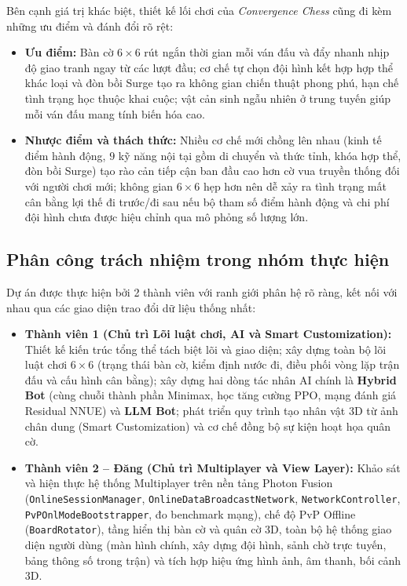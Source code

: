 Bên cạnh giá trị khác biệt, thiết kế lối chơi của \textit{Convergence Chess} cũng đi kèm những ưu điểm và đánh đổi rõ rệt:
\begin{itemize}
    \item \textbf{Ưu điểm:} Bàn cờ $6 \times 6$ rút ngắn thời gian mỗi ván đấu và đẩy nhanh nhịp độ giao tranh ngay từ các lượt đầu; cơ chế tự chọn đội hình kết hợp hợp thể khác loại và đòn bồi Surge tạo ra không gian chiến thuật phong phú, hạn chế tình trạng học thuộc khai cuộc; vật cản sinh ngẫu nhiên ở trung tuyến giúp mỗi ván đấu mang tính biến hóa cao.
    \item \textbf{Nhược điểm và thách thức:} Nhiều cơ chế mới chồng lên nhau (kinh tế điểm hành động, $9$ kỹ năng nội tại gồm di chuyển và thức tỉnh, khóa hợp thể, đòn bồi Surge) tạo rào cản tiếp cận ban đầu cao hơn cờ vua truyền thống đối với người chơi mới; không gian $6 \times 6$ hẹp hơn nên dễ xảy ra tình trạng mất cân bằng lợi thế đi trước/đi sau nếu bộ tham số điểm hành động và chi phí đội hình chưa được hiệu chỉnh qua mô phỏng số lượng lớn.
\end{itemize}

\subsection{Phân công trách nhiệm trong nhóm thực hiện}
Dự án được thực hiện bởi 2 thành viên với ranh giới phân hệ rõ ràng, kết nối với nhau qua các giao diện trao đổi dữ liệu thống nhất:
\begin{itemize}
    \item \textbf{Thành viên 1 (Chủ trì Lõi luật chơi, AI và Smart Customization):} Thiết kế kiến trúc tổng thể tách biệt lõi và giao diện; xây dựng toàn bộ lõi luật chơi $6 \times 6$ (trạng thái bàn cờ, kiểm định nước đi, điều phối vòng lặp trận đấu và cấu hình cân bằng); xây dựng hai dòng tác nhân AI chính là \textbf{Hybrid Bot} (cùng chuỗi thành phần Minimax, học tăng cường PPO, mạng đánh giá Residual NNUE) và \textbf{LLM Bot}; phát triển quy trình tạo nhân vật 3D từ ảnh chân dung (Smart Customization) và cơ chế đồng bộ sự kiện hoạt họa quân cờ.
    \item \textbf{Thành viên 2 -- Đăng (Chủ trì Multiplayer và View Layer):} Khảo sát và hiện thực hệ thống Multiplayer trên nền tảng Photon Fusion (\texttt{OnlineSessionManager}, \texttt{OnlineDataBroadcastNetwork}, \texttt{NetworkController}, \texttt{PvPOnlModeBootstrapper}, đo benchmark mạng), chế độ PvP Offline (\texttt{BoardRotator}), tầng hiển thị bàn cờ và quân cờ 3D, toàn bộ hệ thống giao diện người dùng (màn hình chính, xây dựng đội hình, sảnh chờ trực tuyến, bảng thông số trong trận) và tích hợp hiệu ứng hình ảnh, âm thanh, bối cảnh 3D.
\end{itemize}
